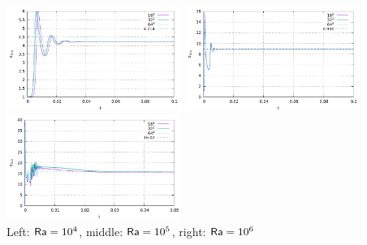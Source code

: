 \begin{center}
\includegraphics[width=5.7cm]{python_codes/fieldstone_110/results_EBA/aspect/qtop_1e4}
\includegraphics[width=5.7cm]{python_codes/fieldstone_110/results_EBA/aspect/qtop_1e5}
\includegraphics[width=5.7cm]{python_codes/fieldstone_110/results_EBA/aspect/qtop_1e6}\\
{\captionfont Left: ${\mathsf{Ra}}=10^4$, middle: ${\mathsf{Ra}}=10^5$, right: ${\mathsf{Ra}}=10^6$} 
\end{center}

\vspace{5mm}

